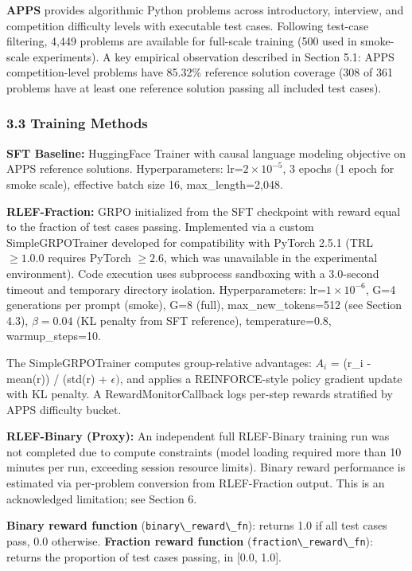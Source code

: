 \textbf{APPS} provides algorithmic Python problems across introductory, interview, and competition difficulty levels with executable test cases. Following test-case filtering, 4,449 problems are available for full-scale training (500 used in smoke-scale experiments). A key empirical observation described in Section 5.1: APPS competition-level problems have 85.32\% reference solution coverage (308 of 361 problems have at least one reference solution passing all included test cases).

\subsubsection{3.3 Training Methods}

\textbf{SFT Baseline:} HuggingFace Trainer with causal language modeling objective on APPS reference solutions. Hyperparameters: lr=$2\times 10^{-5}$, 3 epochs (1 epoch for smoke scale), effective batch size 16, max\_length=2,048.

\textbf{RLEF-Fraction:} GRPO initialized from the SFT checkpoint with reward equal to the fraction of test cases passing. Implemented via a custom SimpleGRPOTrainer developed for compatibility with PyTorch 2.5.1 (TRL $\geq 1.0.0$ requires PyTorch $\geq 2.6$, which was unavailable in the experimental environment). Code execution uses subprocess sandboxing with a 3.0-second timeout and temporary directory isolation. Hyperparameters: lr=$1\times 10^{-6}$, G=4 generations per prompt (smoke), G=8 (full), max\_new\_tokens=512 (see Section 4.3), $\beta =0.04$ (KL penalty from SFT reference), temperature=0.8, warmup\_steps=10.

The SimpleGRPOTrainer computes group-relative advantages: $A_i$ = (r\_i - mean(r)) / (std(r) + $\epsilon )$, and applies a REINFORCE-style policy gradient update with KL penalty. A RewardMonitorCallback logs per-step rewards stratified by APPS difficulty bucket.

\textbf{RLEF-Binary (Proxy):} An independent full RLEF-Binary training run was not completed due to compute constraints (model loading required more than 10 minutes per run, exceeding session resource limits). Binary reward performance is estimated via per-problem conversion from RLEF-Fraction output. This is an acknowledged limitation; see Section 6.

\textbf{Binary reward function} (\texttt{binary\textbackslash \_reward\textbackslash \_fn}): returns 1.0 if all test cases pass, 0.0 otherwise. \textbf{Fraction reward function} (\texttt{fraction\textbackslash \_reward\textbackslash \_fn}): returns the proportion of test cases passing, in [0.0, 1.0].

